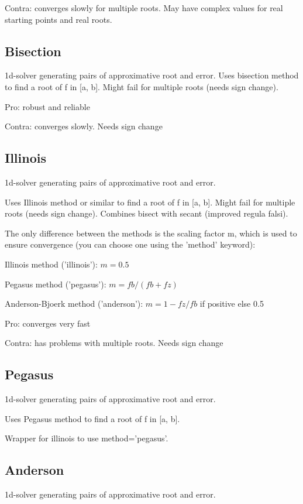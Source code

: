 Contra:  converges slowly for multiple roots. May have complex values for real starting points and real roots.



\subsection{Bisection}
1d-solver generating pairs of approximative root and error.
Uses bisection method to find a root of f in [a, b]. Might fail for multiple roots (needs sign change).

Pro: robust and reliable

Contra:  converges slowly. Needs sign change


\subsection{Illinois}
1d-solver generating pairs of approximative root and error.

Uses Illinois method or similar to find a root of f in [a, b]. Might fail for multiple roots (needs sign change). Combines bisect with secant (improved regula falsi).

The only difference between the methods is the scaling factor m, which is used to ensure convergence (you can choose one using the 'method' keyword):

\vpara
Illinois method ('illinois'): $m = 0.5$

Pegasus method ('pegasus'): $m = fb/(fb + fz)$

Anderson-Bjoerk method ('anderson'): $m = 1 - fz/fb$ if positive else 0.5

\vpara
Pro: converges very fast

Contra:  has problems with multiple roots. Needs sign change




\subsection{Pegasus}
1d-solver generating pairs of approximative root and error.

Uses Pegasus method to find a root of f in [a, b]. 

Wrapper for illinois to use method='pegasus'.



\subsection{Anderson}
1d-solver generating pairs of approximative root and error.

